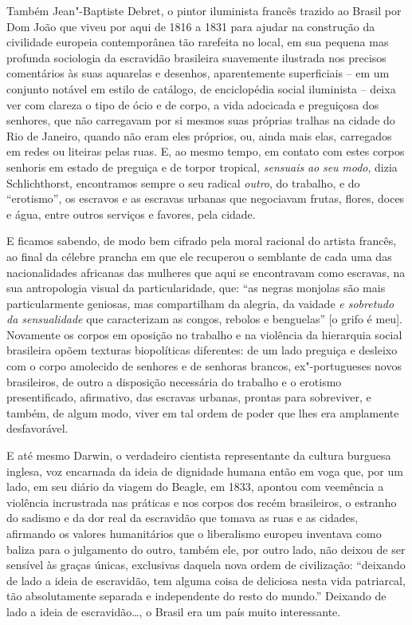 Também Jean"-Baptiste Debret, o pintor iluminista francês trazido ao
Brasil por Dom João  que viveu por aqui de 1816 a 1831 para ajudar na
construção da civilidade europeia contemporânea tão rarefeita no local,
em sua pequena mas profunda sociologia da escravidão brasileira
suavemente ilustrada nos precisos comentários às suas aquarelas e
desenhos, aparentemente superficiais -- em um conjunto notável em estilo
de catálogo, de enciclopédia social iluminista -- deixa ver com clareza
o tipo de ócio e de corpo, a vida adocicada e preguiçosa dos senhores,
que não carregavam por si mesmos suas próprias tralhas na cidade do Rio
de Janeiro, quando não eram eles próprios, ou, ainda mais elas,
carregados em redes ou liteiras pelas ruas. E, ao mesmo tempo, em
contato com estes corpos senhoris em estado de preguiça e de torpor
tropical, \emph{sensuais} \emph{ao} \emph{seu} \emph{modo}, dizia
Schlichthorst, encontramos sempre o seu radical \emph{outro}, do
trabalho, e do ``erotismo'', os escravos e as escravas urbanas que
negociavam frutas, flores, doces e água, entre outros serviços e
favores, pela cidade.

E ficamos sabendo, de modo bem cifrado pela moral racional do artista
francês, ao final da célebre prancha em que ele recuperou o semblante de
cada uma das nacionalidades africanas das mulheres que aqui se
encontravam como escravas, na sua antropologia visual da
particularidade, que: ``as negras monjolas são mais particularmente
geniosas, mas compartilham da alegria, da vaidade \emph{e sobretudo da
sensualidade} que caracterizam as congos, rebolos e benguelas'' {[}o
grifo é meu{]}. Novamente os corpos em oposição no trabalho e na
violência da hierarquia social brasileira opõem texturas biopolíticas
diferentes: de um lado preguiça e desleixo com o corpo amolecido de
senhores e de senhoras brancos, ex"-portugueses novos brasileiros, de
outro a disposição necessária do trabalho e o erotismo presentificado,
afirmativo, das escravas urbanas, prontas para sobreviver, e também, de
algum modo, viver em tal ordem de poder que lhes era amplamente
desfavorável.

E até mesmo Darwin, o verdadeiro cientista representante da cultura
burguesa inglesa, voz encarnada da ideia de dignidade humana então em
voga que, por um lado, em seu diário da viagem do Beagle, em 1833,
apontou com veemência a violência incrustrada nas práticas e nos corpos
dos recém brasileiros, o estranho do sadismo e da dor real da escravidão
que tomava as ruas e as cidades, afirmando os valores humanitários que o
liberalismo europeu inventava como baliza para o julgamento do outro,
também ele, por outro lado, não deixou de ser sensível às graças únicas,
exclusivas daquela nova ordem de civilização: ``deixando de lado a ideia
de escravidão, tem alguma coisa de deliciosa nesta vida patriarcal, tão
absolutamente separada e independente do resto do mundo.'' Deixando de
lado a ideia de escravidão\ldots{}, o Brasil era um país muito interessante.

